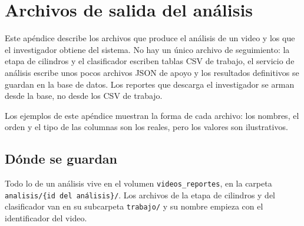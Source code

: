 
\chapter{Archivos de salida del análisis}
\label{ap:salidas}

Este apéndice describe los archivos que produce el análisis de un video y los que el
investigador obtiene del sistema. No hay un único archivo de seguimiento: la etapa de
cilindros y el clasificador escriben tablas CSV de trabajo, el servicio de análisis
escribe unos pocos archivos JSON de apoyo y los resultados definitivos se guardan en
la base de datos. Los reportes que descarga el investigador se arman desde la base, no
desde los CSV de trabajo.

Los ejemplos de este apéndice muestran la forma de cada archivo: los nombres, el orden
y el tipo de las columnas son los reales, pero los valores son ilustrativos.

\section{Dónde se guardan}

Todo lo de un análisis vive en el volumen \texttt{videos\_reportes}, en la carpeta
\texttt{analisis/\{id del análisis\}/}. Los archivos de la etapa de cilindros y del
clasificador van en su subcarpeta \texttt{trabajo/} y su nombre empieza con el
identificador del video.

